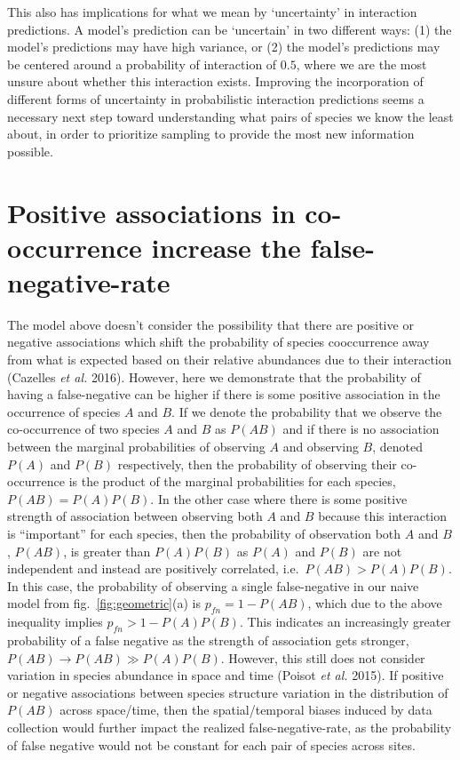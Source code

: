 \documentclass[10pt,oneside]{article}
\begin{document}
This also has implications for what we mean by `uncertainty' in
interaction predictions. A model's prediction can be `uncertain' in two
different ways: (1) the model's predictions may have high variance, or
(2) the model's predictions may be centered around a probability of
interaction of \(0.5\), where we are the most unsure about whether this
interaction exists. Improving the incorporation of different forms of
uncertainty in probabilistic interaction predictions seems a necessary
next step toward understanding what pairs of species we know the least
about, in order to prioritize sampling to provide the most new
information possible.

\hypertarget{positive-associations-in-co-occurrence-increase-the-false-negative-rate}{%
\section{Positive associations in co-occurrence increase the
false-negative-rate}\label{positive-associations-in-co-occurrence-increase-the-false-negative-rate}}

The model above doesn't consider the possibility that there are positive
or negative associations which shift the probability of species
cooccurrence away from what is expected based on their relative
abundances due to their interaction (Cazelles \emph{et al.} 2016).
However, here we demonstrate that the probability of having a
false-negative can be higher if there is some positive association in
the occurrence of species \(A\) and \(B\). If we denote the probability
that we observe the co-occurrence of two species \(A\) and \(B\) as
\(P(AB)\) and if there is no association between the marginal
probabilities of observing \(A\) and observing \(B\), denoted \(P(A)\)
and \(P(B)\) respectively, then the probability of observing their
co-occurrence is the product of the marginal probabilities for each
species, \(P(AB) = P(A)P(B)\). In the other case where there is some
positive strength of association between observing both \(A\) and \(B\)
because this interaction is ``important'' for each species, then the
probability of observation both \(A\) and \(B\), \(P(AB)\), is greater
than \(P(A)P(B)\) as \(P(A)\) and \(P(B)\) are not independent and
instead are positively correlated, i.e.~\(P(AB)> P(A)P(B)\). In this
case, the probability of observing a single false-negative in our naive
model from fig.~\ref{fig:geometric}(a) is \(p_{fn}= 1-P(AB)\), which due
to the above inequality implies \(p_{fn}>1-P(A)P(B)\). This indicates an
increasingly greater probability of a false negative as the strength of
association gets stronger, \(P(AB) \to P(AB) \gg P(A)P(B)\). However,
this still does not consider variation in species abundance in space and
time (Poisot \emph{et al.} 2015). If positive or negative associations
between species structure variation in the distribution of \(P(AB)\)
across space/time, then the spatial/temporal biases induced by data
collection would further impact the realized false-negative-rate, as the
probability of false negative would not be constant for each pair of
species across sites.
\end{document}
